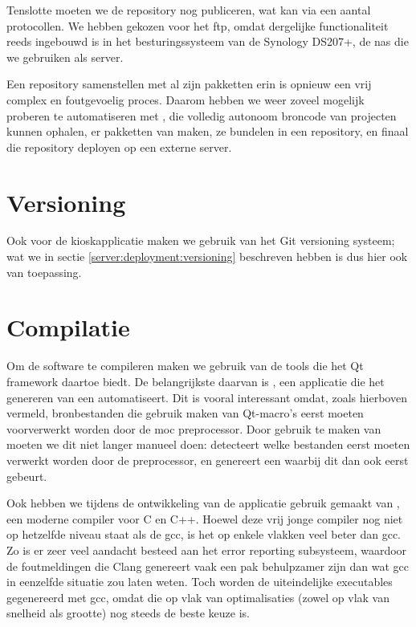 Tenslotte moeten we de repository nog publiceren, wat kan via een aantal protocollen. We hebben gekozen voor het \ac{ftp}, omdat dergelijke functionaliteit reeds ingebouwd is in het besturingssysteem van de Synology DS207+, de \ac{nas} die we gebruiken als server.

Een repository samenstellen met al zijn pakketten erin is opnieuw een vrij complex en foutgevoelig proces. Daarom hebben we weer zoveel mogelijk proberen te automatiseren met , die volledig autonoom broncode van projecten kunnen ophalen, er pakketten van maken, ze bundelen in een repository, en finaal die repository deployen op een externe server.

\section{Versioning}
\label{kiosk:deployment:versioning}

Ook voor de kioskapplicatie maken we gebruik van het Git versioning systeem; wat we in sectie \ref{server:deployment:versioning} beschreven hebben is dus hier ook van toepassing.

\section{Compilatie}
\label{kiosk:deployment:compilatie}

Om de software te compileren maken we gebruik van de tools die het Qt framework daartoe biedt. De belangrijkste daarvan is , een applicatie die het genereren van een  automatiseert. Dit is vooral interessant omdat, zoals hierboven vermeld, bronbestanden die gebruik maken van Qt-macro's eerst moeten voorverwerkt worden door de \ac{moc} preprocessor. Door gebruik te maken van  moeten we dit niet langer manueel doen:  detecteert welke bestanden eerst moeten verwerkt worden door de preprocessor, en genereert een  waarbij dit dan ook eerst gebeurt.

Ook hebben we tijdens de ontwikkeling van de applicatie gebruik gemaakt van , een moderne compiler voor C en C++. Hoewel deze vrij jonge compiler nog niet op hetzelfde niveau staat als de \ac{gcc}, is het op enkele vlakken veel beter dan \ac{gcc}. Zo is er zeer veel aandacht besteed aan het error reporting subsysteem, waardoor de foutmeldingen die Clang genereert vaak een pak behulpzamer zijn dan wat \ac{gcc} in eenzelfde situatie zou laten weten. Toch worden de uiteindelijke executables gegenereerd met \ac{gcc}, omdat die op vlak van optimalisaties (zowel op vlak van snelheid als grootte) nog steeds de beste keuze is.

